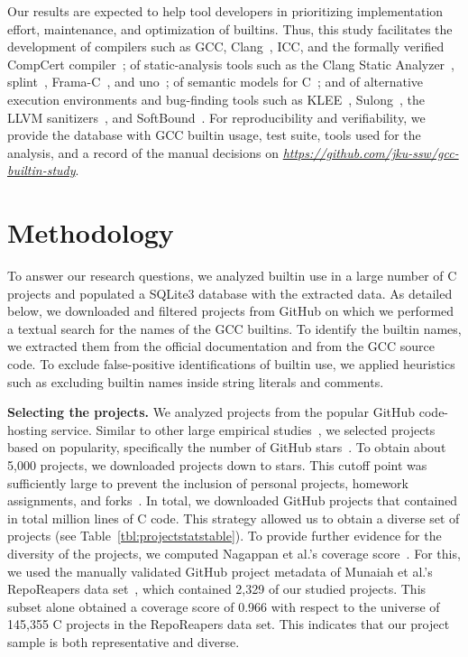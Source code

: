 \documentclass[sigconf,screen]{acmart}
\renewcommand{\paragraph}[1]{\textbf{#1}}
\begin{document}
Our results are expected to help tool developers in prioritizing implementation effort, maintenance, and optimization of builtins.
Thus, this study facilitates the development of compilers such as GCC, Clang~\cite{llvm}, ICC, and the formally verified CompCert compiler~\cite{compcert1,compcert2}; of static-analysis tools such as the Clang Static Analyzer~\cite{clangstaticanalyzer}, splint~\cite{splint,lclint}, Frama-C~\cite{framacinline}, and uno~\cite{uno}; of semantic models for C~\cite{depths,typedc11semantics}; and of alternative execution environments and bug-finding tools such as KLEE~\cite{cadar_klee_2008}, Sulong~\cite{native-sulong,asplos}, the LLVM sanitizers~\cite{msan,asan}, and SoftBound~\cite{softbound,cets}.
For reproducibility and verifiability, we provide the database with GCC builtin usage, test suite, tools used for the analysis, and a record of the manual decisions on \emph{\url{https://github.com/jku-ssw/gcc-builtin-study}}.

\section{Methodology}

To answer our research questions, we analyzed builtin use in a large number of C projects and populated a SQLite3 database with the extracted data.
As detailed below, we downloaded and filtered projects from GitHub on which we performed a textual search for the names of the GCC builtins.
To identify the builtin names, we extracted them from the official documentation and from the GCC source code.
To exclude false-positive identifications of builtin use,
we applied heuristics such as excluding builtin names inside string literals and comments.

\paragraph{Selecting the projects.}
We analyzed projects from the popular GitHub code-hosting service.
Similar to other large empirical studies~\cite{qiu:javafeatures,wu:concurrencyconstructs,Casalnuovo:asserts}, we selected projects based on popularity, specifically the number of GitHub stars~\cite{githubpopularity}.
To obtain about 5,000 projects, we downloaded projects down to \nrFromStars{} stars.
This cutoff point was sufficiently large to prevent the inclusion of personal projects, homework assignments, and forks~\cite{perils}.
In total, we downloaded \nrProjectsUnfiltered{} GitHub projects that contained in total \totalMLoc{} million lines of C code.
This strategy allowed us to obtain a diverse set of projects (see Table~\ref{tbl:projectstatstable}).
To provide further evidence for the diversity of the projects, we computed Nagappan et al.'s coverage score~\cite{Nagappan:diversity}. For this, we used the manually validated GitHub project metadata of Munaiah et al.'s RepoReapers data set~\cite{Munaiah2017}, which contained 2,329 of our studied projects. %
This subset alone obtained a coverage score of 0.966 with respect to the universe of 145,355 C projects in the RepoReapers data set. This indicates that our project sample is both representative and diverse.
\end{document}
